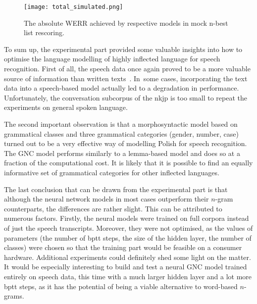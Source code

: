 \begin{figure}[!htbp]
	  \centering
	  \texttt{[image: total\_simulated.png]}
	  \caption[Absolute WERR achieved in mock n-best list rescoring]{The absolute WERR achieved by respective models in mock n-best list rescoring.}
	      \label{figure:total_mock}
\end{figure}

To sum up, the experimental part provided some valuable insights into how to optimise the language modelling of highly inflected language for speech recognition. First of all, the speech data once again proved to be a more valuable source of information than written texts~\cite{dziadzio2015comparison}. In~some cases, incorporating the text data into a speech-based model actually led to a degradation in performance. Unfortunately, the conversation subcorpus of the \gls{nkjp} is too small to repeat the experiments on general spoken language. 

The second important observation is that a morphosyntactic model based on grammatical classes and three grammatical categories (gender, number, case) turned out to be a very effective way of modelling Polish for speech recognition. The GNC model performs similarly to a \mbox{lemma-based} model and does so at a fraction of the computational cost. It is likely that it is possible to find an equally informative set of grammatical categories for other inflected languages. 

The last conclusion that can be drawn from the experimental part is that although the neural network models in most cases outperform their \mbox{$n$-gram} counterparts, the differences are rather slight. This can be attributed to numerous factors. Firstly, the neural models were trained on full corpora instead of just the speech transcripts. Moreover, they were not optimised, as the values of parameters (the number of \gls{bptt} steps, the size of the hidden layer, the number of classes) were chosen so that the training part would be feasible on a consumer hardware. Additional experiments could definitely shed some light on the matter. It would be especially interesting to build and test a neural GNC model trained entirely on speech data, this time with a much larger hidden layer and a lot more \gls{bptt} steps, as it has the potential of being a viable alternative to \mbox{word-based} \mbox{$n$-grams}.

